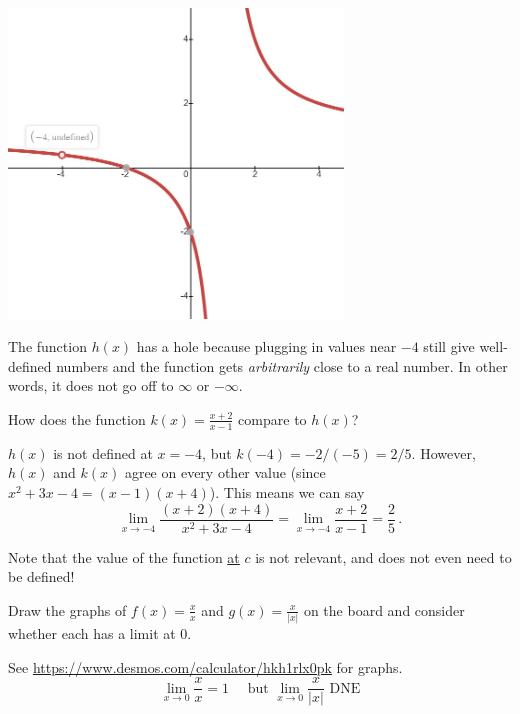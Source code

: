 \documentclass[11pt]{exam}
\begin{document}
\begin{questions}
\includegraphics[width=3.5in]{rational.jpg}
\begin{solution}
  The function \(h(x)\) has a hole because plugging in values near \(-4\) still
  give well-defined numbers and the function gets \emph{arbitrarily}
  close to a real number. In other words, it does not go off to
  \(\infty\) or \(-\infty\). 
\end{solution}
How does the function $k(x)=\displaystyle\frac{x+2}{x-1}$ compare to $h(x)$?
\begin{solution}
  \(h(x)\) is not defined at \(x=-4\), but \(k(-4) = -2/(-5) =
  2/5\). However, \(h(x)\) and \(k(x)\) agree on every other
  value (since \(x^2+3x-4 = (x-1)(x+4)\)). This means we can say \[
    \lim_{x \to -4} \frac{(x+2)(x+4)}{x^2+3x-4} = \lim_{x \to -4}
    \frac{x+2}{x-1} = \frac{2}{5} \,.
  \]
\end{solution}
\pagebreak
%
%

\vspace{-0.1in}
\noindent{}
Note that the value of the function \underline{at} $c$ is not
relevant, and does not even need to be defined!

\question Draw the graphs of $f(x) =\displaystyle \frac{x}{x}$ and
$g(x) = \displaystyle \frac{x}{|x|}$ on the board and consider whether each has a limit at 0.
\begin{solution}
  See
  \href{https://www.desmos.com/calculator/hkh1rlx0pk}{https://www.desmos.com/calculator/hkh1rlx0pk}
  for graphs. \[
    \lim_{x\to 0} \frac{x}{x} = 1 \quad\text{ but } \lim_{x \to 0}
    \frac{x}{|x|} \text{ DNE}
  \]
\end{solution}


\end{questions}
\end{document}
